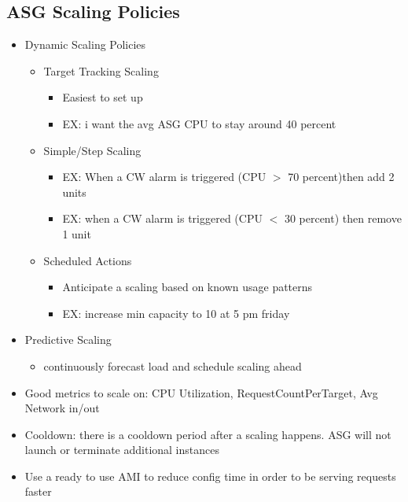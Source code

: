 \documentclass[]{scrartcl}
\begin{document}
\subsection{ASG Scaling Policies}
\begin{itemize}
	\item Dynamic Scaling Policies
	\begin{itemize}
		\item Target Tracking Scaling
		\begin{itemize}
			\item Easiest to set up
			\item EX: i want the avg ASG CPU to stay around 40 percent
		\end{itemize}
		\item Simple/Step Scaling
		\begin{itemize}
			\item EX: When a CW alarm is triggered (CPU $>$ 70 percent)then add 2 units
			\item EX: when a CW alarm is triggered (CPU $<$ 30 percent) then remove 1 unit
		\end{itemize}
		\item Scheduled Actions
		\begin{itemize}
			\item Anticipate a scaling based on known usage patterns
			\item EX: increase min capacity to 10 at 5 pm friday
		\end{itemize}
	\end{itemize}
	\item Predictive Scaling
	\begin{itemize}
		\item continuously forecast load and schedule scaling ahead
	\end{itemize}
	\item Good metrics to scale on: CPU Utilization, RequestCountPerTarget, Avg Network in/out
	\item Cooldown: there is a cooldown period after a scaling happens. ASG will not launch or terminate additional instances
	\item Use a ready to use AMI to reduce config time in order to be serving requests faster
\end{itemize}
\end{document}
